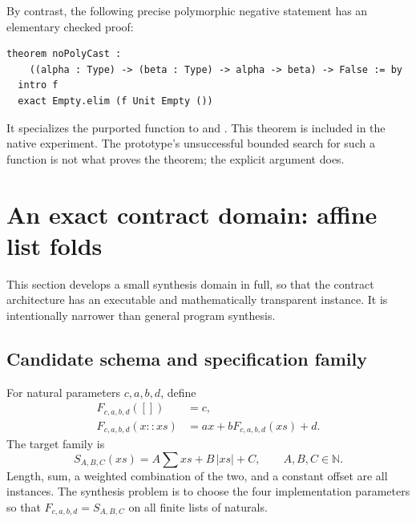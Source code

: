 By contrast, the following precise polymorphic negative statement has an elementary checked proof:
\begin{lstlisting}
theorem noPolyCast :
    ((alpha : Type) -> (beta : Type) -> alpha -> beta) -> False := by
  intro f
  exact Empty.elim (f Unit Empty ())
\end{lstlisting}
It specializes the purported function to  and . This theorem is included in the native experiment. The prototype's unsuccessful bounded search for such a function is not what proves the theorem; the explicit argument does.

\section{An exact contract domain: affine list folds}
\label{sec:affine}
This section develops a small synthesis domain in full, so that the contract architecture has an executable and mathematically transparent instance. It is intentionally narrower than general program synthesis.

\subsection{Candidate schema and specification family}
For natural parameters $c,a,b,d$, define
\begin{align*}
 F_{c,a,b,d}([])&=c,\\
 F_{c,a,b,d}(x::xs)&=a x+bF_{c,a,b,d}(xs)+d.
\end{align*}
The target family is
\[
 S_{A,B,C}(xs)=A\sum xs+B\,|xs|+C,
 \qquad A,B,C\in\mathbb N.
\]
Length, sum, a weighted combination of the two, and a constant offset are all instances. The synthesis problem is to choose the four implementation parameters so that $F_{c,a,b,d}=S_{A,B,C}$ on all finite lists of naturals.

